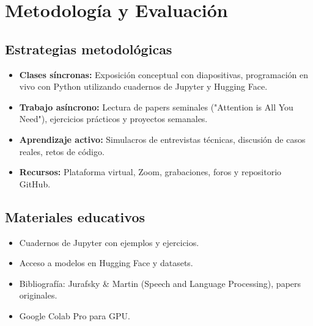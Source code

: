\documentclass[12pt,a4paper,openany,oneside]{book}
\begin{document}
\chapter{Metodología y Evaluación}

\section{Estrategias metodológicas}
\begin{itemize}
    \item \textbf{Clases síncronas:} Exposición conceptual con diapositivas, programación en vivo con Python utilizando cuadernos de Jupyter y Hugging Face.
    \item \textbf{Trabajo asíncrono:} Lectura de papers seminales ("Attention is All You Need"), ejercicios prácticos y proyectos semanales.
    \item \textbf{Aprendizaje activo:} Simulacros de entrevistas técnicas, discusión de casos reales, retos de código.
    \item \textbf{Recursos:} Plataforma virtual, Zoom, grabaciones, foros y repositorio GitHub.
\end{itemize}

\section{Materiales educativos}
\begin{itemize}
    \item Cuadernos de Jupyter con ejemplos y ejercicios.
    \item Acceso a modelos en Hugging Face y datasets.
    \item Bibliografía: Jurafsky \& Martin (Speech and Language Processing), papers originales.
    \item Google Colab Pro para GPU.
\end{itemize}
\end{document}
